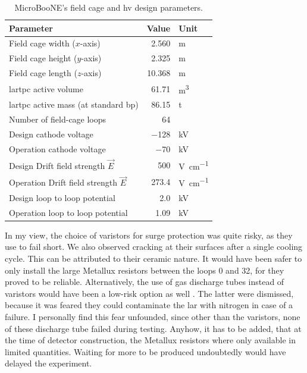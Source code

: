 \begin{table}[hbtp]
    \centering
    \caption[MicroBooNE's Field Cage and HV Design Parameters]{MicroBooNE's field cage and \gls{hv} design parameters.}
    \begin{tabu} to 0.7\textwidth{lrl} \toprule
    Parameter & Value & Unit \\ \midrule
        Field cage width ($x$-axis) & \num{2.560} & \si{\metre} \\
        Field cage height ($y$-axis) & \num{2.325} & \si{\metre} \\
        Field cage length ($z$-axis) & \num{10.368} & \si{\metre} \\
        \Gls{lartpc} active volume & \num{61.71} & \si{\metre\cubed} \\
        \Gls{lartpc} active mass (at standard \gls{bp}) & \num{86.15} & \si{\tonne} \\
        Number of field-cage loops & 64 & \\
        Design cathode voltage & \num{-128} & \si{\kilo\volt} \\
        Operation cathode voltage & \num{-70} & \si{\kilo\volt} \\
        Design Drift field strength $\vec{E}$ & \num{500} & \si{\volt\per\centi\metre} \\
        Operation Drift field strength $\vec{E}$ & \num{273.4} & \si{\volt\per\centi\metre} \\
        Design loop to loop potential & \num{2.0} & \si{\kilo\volt} \\
        Operation loop to loop potential & \num{1.09} & \si{\kilo\volt} \\ \bottomrule
    \end{tabu}
    \label{tab:FieldCageDimensions}
\end{table}

In my view, the choice of varistors for surge protection was quite risky, as they use to fail short. We also observed cracking at their surfaces after a single cooling cycle. This can be attributed to their ceramic nature. It would have been safer to only install the large Metallux resistors between the loops \num{0} and \num{32}, for they proved to be reliable. Alternatively, the use of gas discharge tubes instead of varistors would have been a low-risk option as well \cite{SurgeProtection}. The latter were dismissed, because it was feared they could contaminate the \gls{lar} with nitrogen in case of a failure. I personally find this fear unfounded, since other than the varistors, none of these discharge tube failed during testing. Anyhow, it has to be added, that at the time of detector construction, the Metallux resistors where only available in limited quantities. Waiting for more to be produced undoubtedly would have delayed the experiment.  

